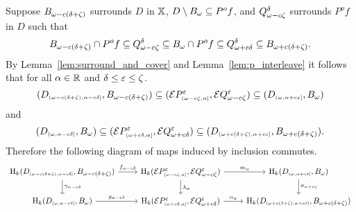 
Suppose $B_{\omega - c(\delta+\zeta)}$ surrounds $D$ in $\mathbb{X}$, $D\setminus B_{\omega}\subseteq P^of$, and $Q_{\omega - c\zeta}^{\delta}$ surrounds $P^of$ in $D$ such that
\[ B_{\omega - c(\delta+\zeta)}\cap P^of \subseteq Q_{\omega - c\zeta}^{\delta}\subseteq B_{\omega}\cap P^of\subseteq Q_{\omega + c{\delta}}^{\delta}\subseteq B_{\omega + c(\delta+\zeta)}.\]
By Lemma~\ref{lem:surround_and_cover} and Lemma~\ref{lem:p_interleave} it follows that for all $\alpha\in\mathbb{R}$ and $\delta\leq\varepsilon\leq\zeta$.
\[ (D_{\scriptscriptstyle (\omega-c(\delta+\zeta),\alpha-c\delta]},B_{\omega - c(\delta+\zeta)})\subseteq (\mathcal{E} P^\varepsilon_{\scriptscriptstyle (\omega-c\zeta,\alpha]},\mathcal{E} Q_{\omega - c\zeta}^\varepsilon)\subseteq (D_{\scriptscriptstyle (\omega,\alpha+c\varepsilon]},B_{\omega})\]
and
\[ (D_{\scriptscriptstyle (\omega,\alpha-c\delta]},B_{\omega})\subseteq (\mathcal{E} P^\varepsilon_{\scriptscriptstyle (\omega+c\delta,\alpha]},\mathcal{E} Q_{\omega + c{\delta}}^\varepsilon)\subseteq (D_{\scriptscriptstyle (\omega+c(\delta+\zeta),\alpha+c\varepsilon]},B_{\omega + c(\delta+\zeta)}).\]
Therefore the following diagram of maps induced by inclusion commutes.
\begin{equation}\label{dgm:interleaving2}
\begin{tikzcd}
  \hom_k(D\subi{\omega-c(\delta+\zeta), \alpha-c\of}, \b)\arrow{r}{f_{\alpha-c\delta}}\arrow{d}{\gamma_{\alpha-c\delta}} &
  \hom_k(\ext{P^\e\subi{\omega-c\zeta,\alpha}},\ext{\Q^\e})\arrow{r}{m_\alpha}\arrow{d}{\lambda_\alpha} &
  \hom_k(D\subi{\omega,\alpha+c\e}, \B)\arrow{d}{\pi_{\alpha+c\e}}\\
  \hom_k(D\subi{\omega,\alpha-c\of}, \B)\arrow{r}{g_{\alpha-c\of}} &
  \hom_k(\ext{P^\e\subi{\omega+c\of,\alpha}}, \ext{\QQ^\e})\arrow{r}{n_\alpha} &
  \hom_k(D\subi{\omega+c(\delta+\zeta),\alpha+c\e}, \BB)
\end{tikzcd}\end{equation}

